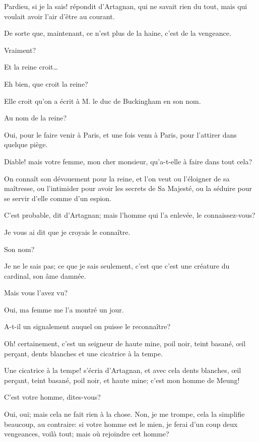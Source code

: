 \speak  Pardieu, si je la sais! répondit d'Artagnan, qui ne savait rien du tout, mais qui voulait avoir l'air d'être au courant. 

\speak  De sorte que, maintenant, ce n'est plus de la haine, c'est de la vengeance. 

\speak  Vraiment? 

\speak  Et la reine croit\dots 

\speak  Eh bien, que croit la reine? 

\speak  Elle croit qu'on a écrit à M. le duc de Buckingham en son nom. 

\speak  Au nom de la reine? 

\speak  Oui, pour le faire venir à Paris, et une fois venu à Paris, pour l'attirer dans quelque piège. 

\speak  Diable! mais votre femme, mon cher monsieur, qu'a-t-elle à faire dans tout cela? 

\speak  On connaît son dévouement pour la reine, et l'on veut ou l'éloigner de sa maîtresse, ou l'intimider pour avoir les secrets de Sa Majesté, ou la séduire pour se servir d'elle comme d'un espion. 

\speak  C'est probable, dit d'Artagnan; mais l'homme qui l'a enlevée, le connaissez-vous? 

\speak  Je vous ai dit que je croyais le connaître. 

\speak  Son nom? 

\speak  Je ne le sais pas; ce que je sais seulement, c'est que c'est une créature du cardinal, son âme damnée. 

\speak  Mais vous l'avez vu? 

\speak  Oui, ma femme me l'a montré un jour. 

\speak  A-t-il un signalement auquel on puisse le reconnaître? 

\speak  Oh! certainement, c'est un seigneur de haute mine, poil noir, teint basané, œil perçant, dents blanches et une cicatrice à la tempe. 

\speak  Une cicatrice à la tempe! s'écria d'Artagnan, et avec cela dents blanches, œil perçant, teint basané, poil noir, et haute mine; c'est mon homme de Meung! 

\speak  C'est votre homme, dites-vous? 

\speak  Oui, oui; mais cela ne fait rien à la chose. Non, je me trompe, cela la simplifie beaucoup, au contraire: si votre homme est le mien, je ferai d'un coup deux vengeances, voilà tout; mais où rejoindre cet homme? 

